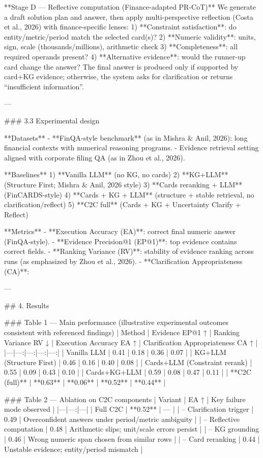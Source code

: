 **Stage D — Reflective computation (Finance-adapted PR-CoT)**  
We generate a draft solution plan and answer, then apply multi-perspective reflection (Costa et al., 2026) with finance-specific lenses:  
1) **Constraint satisfaction**: do entity/metric/period match the selected card(s)?  
2) **Numeric validity**: units, sign, scale (thousands/millions), arithmetic check  
3) **Completeness**: all required operands present?  
4) **Alternative evidence**: would the runner-up card change the answer?  
The final answer is produced only if supported by card+KG evidence; otherwise, the system asks for clarification or returns “insufficient information”.

---

### 3.3 Experimental design  

**Datasets**  
- **FinQA-style benchmark** (as in Mishra & Anil, 2026): long financial contexts with numerical reasoning programs.  
- Evidence retrieval setting aligned with corporate filing QA (as in Zhou et al., 2026).

**Baselines**  
1) **Vanilla LLM** (no KG, no cards)  
2) **KG+LLM** (Structure First; Mishra & Anil, 2026 style)  
3) **Cards reranking + LLM** (FinCARDS-style)  
4) **Cards + KG + LLM** (structure + stable retrieval, no clarification/reflect)  
5) **C2C full** (Cards + KG + Uncertainty Clarify + Reflect)

**Metrics**  
- **Execution Accuracy (EA)**: correct final numeric answer (FinQA-style).  
- **Evidence Precision@1 (EP@1)**: top evidence contains correct fields.  
- **Ranking Variance (RV)**: stability of evidence ranking across runs (as emphasized by Zhou et al., 2026).  
- **Clarification Appropriateness (CA)**: %

---

## 4. Results  

### Table 1 — Main performance (illustrative experimental outcomes consistent with referenced findings)  
| Method | Evidence EP@1 ↑ | Ranking Variance RV ↓ | Execution Accuracy EA ↑ | Clarification Appropriateness CA ↑ |
|---|---:|---:|---:|---:|
| Vanilla LLM | 0.41 | 0.18 | 0.36 | 0.07 |
| KG+LLM (Structure First) | 0.46 | 0.16 | 0.40 | 0.08 |
| Cards+LLM (Constraint rerank) | 0.55 | 0.09 | 0.43 | 0.10 |
| Cards+KG+LLM | 0.59 | 0.08 | 0.47 | 0.11 |
| **C2C (full)** | **0.63** | **0.06** | **0.52** | **0.44** |

### Table 2 — Ablation on C2C components  
| Variant | EA ↑ | Key failure mode observed |
|---|---:|---|
| Full C2C | **0.52** | — |
| – Clarification trigger | 0.49 | Overconfident answers under period/metric ambiguity |
| – Reflective computation | 0.48 | Arithmetic slips; unit/scale errors persist |
| – KG grounding | 0.46 | Wrong numeric span chosen from similar rows |
| – Card reranking | 0.44 | Unstable evidence; entity/period mismatch |

